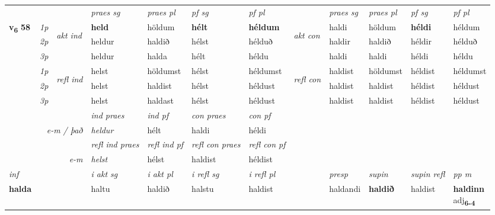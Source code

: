 \begin{longtable}[l]{X>{\footnotesize\itshape}llXXXXlXXXX}
\midrule

\midrule
 & &   & \textit{praes sg}  & \textit{praes pl}    & \textit{ pf sg} & \textit{pf pl} & & \textit{praes sg}  & \textit{praes pl}    & \textit{pf sg} & \textit{pf pl }  \\ \cmidrule{4-7} \cmidrule{9-12}
 \multirow{2}{*}{{{\textbf{v{\textsubscript{6}}} \Large{\textbf{58}}}}}  & 1p & \multirow{3}{*}{\begin{turn}{90}\textit{akt ind}\end{turn}} & \textbf{held} & höldum & \textbf{hélt} & \textbf{héldum} & \multirow{3}{*}{\begin{turn}{90}\textit{akt con}\end{turn}} &haldi & höldum & \textbf{héldi} & héldum\\*
 & 2p &  &  heldur  & haldið & hélst & hélduð & & haldir & haldið & héldir & hélduð \\*
 & 3p &  & heldur & halda & hélt & héldu & & haldi & haldi& héldi & héldu \\*
\cmidrule{4-7} \cmidrule{9-12}
 & 1p & \multirow{3}{*}{\begin{turn}{90}\textit{refl ind}\end{turn}}  & helst & höldumst & hélst & héldumst & \multirow{3}{*}{\begin{turn}{90}\textit{refl con}\end{turn}}  &haldist & höldumst & héldist & héldumst \\*
 & 2p &  & helst & haldist & hélst & héldust & &haldist & haldist & héldist & héldust \\*
 & 3p  & & helst & haldast & hélst & héldust & & haldist & haldist& héldist & héldust \\*
\cmidrule{4-7} \cmidrule{9-12}

   && &  \textit{ind praes} & \textit{ind pf} & \textit{con praes} & \textit{con pf} \\*
\multicolumn{3}{r}{\textit{e-m / það}} & heldur & hélt & haldi & héldi \\*

\cmidrule{4-7}
 & && \textit{refl ind praes} & \textit{refl ind pf} & \textit{refl con praes} & \textit{refl con pf} \\*
\multicolumn{3}{r}{\textit{e-m}}& helst & hélst & haldist & héldist \\*

\cmidrule{4-7}
   {\textit{inf}} & &  & \textit{i akt sg} & \textit{i akt pl} & \textit{i refl sg} & \textit{i refl pl} && \textit{presp} & \textit{supin} & \textit{supin refl} & \textit{pp m} \\*
  {\textbf{halda}} & && haltu  & haldið & halstu & haldist && haldandi &  \textbf{haldið} & haldist & \specialcell{\textbf{haldinn} \\ adj\textbf{\textsubscript{6-4}}} \\*


\end{longtable}
